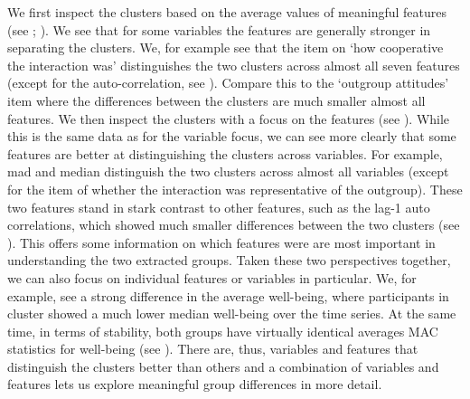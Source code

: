 We first inspect the clusters based on the average values of meaningful
features (see ; \citealp{Kennedy2021}). We
see that for some variables the features are generally stronger in
separating the clusters. We, for example see that the item on `how
cooperative the interaction was' distinguishes the two clusters across
almost all seven features (except for the auto-correlation, see
). Compare this to the `outgroup
attitudes' item where the differences between the clusters are much
smaller almost all features. We then inspect the clusters with a focus
on the features (see ). While this is the
same data as for the variable focus, we can see more clearly that some
features are better at distinguishing the clusters across variables. For
example, mad and median distinguish the two clusters across almost all
variables (except for the item of whether the interaction was
representative of the outgroup). These two features stand in stark
contrast to other features, such as the lag-1 auto correlations, which
showed much smaller differences between the two clusters (see
). This offers some information on which
features were are most important in understanding the two extracted
groups. Taken these two perspectives together, we can also focus on
individual features or variables in particular. We, for example, see a
strong difference in the average well-being, where participants in
cluster showed a much lower median well-being over the time series. At
the same time, in terms of stability, both groups have virtually
identical averages MAC statistics for well-being (see
). There are, thus, variables and features
that distinguish the clusters better than others and a combination of
variables and features lets us explore meaningful group differences in
more detail.

